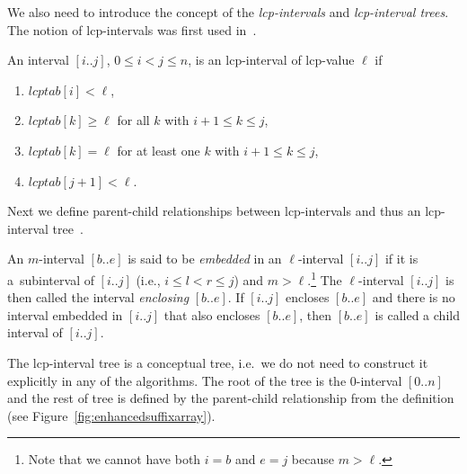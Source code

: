 We also need to introduce the concept of the \emph{lcp-intervals} and \emph{lcp-interval trees}. The notion of lcp-intervals was first used in~\cite{enhancedsuffixarrays}.
\begin{definition}
An interval $[i..j]$, $0 \leq i < j \leq n$, is an lcp-interval of lcp-value $\ell$ if

\begin{enumerate}
\item $lcptab[i] < \ell$,
\item $lcptab[k] \geq \ell$ for all $k$ with $i + 1 \leq k \leq j$,
\item $lcptab[k] = \ell$ for at least one $k$ with $i + 1 \leq k \leq j$,
\item $lcptab[j + 1] < \ell$.
\end{enumerate}
\end{definition}

Next we define parent-child relationships between lcp-intervals and thus an lcp-interval tree~\cite{enhancedsuffixarrays}.

\begin{definition}
  An $m$-interval $[b..e]$ is said to be \emph{embedded} in an $\ell$-interval $[i..j]$ if it is a~subinterval of $[i..j]$ (i.e., $i \leq l < r \leq j $) and $m > \ell$.\footnote{Note that we cannot have both $i = b$ and $e = j$ because $m > \ell$.}
  The $\ell$-interval $[i..j ]$ is then called the interval \emph{enclosing} $[b..e]$. If $[i..j]$ encloses $[b..e]$ and there is no interval embedded in $[i..j]$ that also encloses $[b..e]$, then $[b..e]$ is called a child interval of $[i..j]$.
\end{definition}

The lcp-interval tree is a conceptual tree, i.e.\ we do not need to construct it explicitly in any of the algorithms. The root of the tree is the $0$-interval $[0..n]$ and the rest of tree is defined by the parent-child relationship from the definition (see Figure~\ref{fig:enhancedsuffixarray}).

